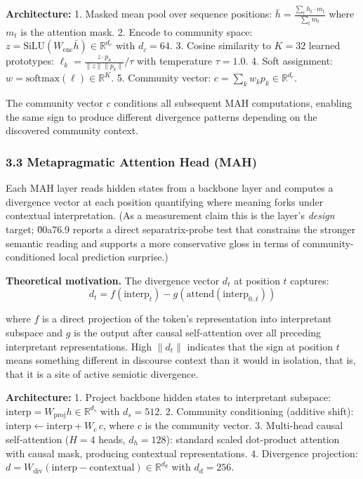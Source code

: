 \documentclass[
  11pt]{article}
\begin{document}
\textbf{Architecture:} 1. Masked mean pool over sequence positions:
\(\bar{h} = \frac{\sum_t h_t \cdot m_t}{\sum_t m_t}\) where \(m_t\) is
the attention mask. 2. Encode to community space:
\(z = \text{SiLU}(W_{\text{enc}} \bar{h}) \in \mathbb{R}^{d_c}\) with
\(d_c = 64\). 3. Cosine similarity to \(K = 32\) learned prototypes:
\(\ell_k = \frac{z \cdot p_k}{\|z\| \|p_k\|} / \tau\) with temperature
\(\tau = 1.0\). 4. Soft assignment:
\(w = \text{softmax}(\ell) \in \mathbb{R}^K\). 5. Community vector:
\(c = \sum_k w_k p_k \in \mathbb{R}^{d_c}\).

The community vector \(c\) conditions all subsequent MAH computations,
enabling the same sign to produce different divergence patterns
depending on the discovered community context.

\subsubsection{3.3 Metapragmatic Attention Head
(MAH)}\label{metapragmatic-attention-head-mah}

Each MAH layer reads hidden states from a backbone layer and computes a
divergence vector at each position quantifying where meaning forks under
contextual interpretation. (As a measurement claim this is the layer's
\emph{design} target; \u00a76.9 reports a direct separatrix-probe test
that constrains the stronger semantic reading and supports a more
conservative gloss in terms of community-conditioned local prediction
surprise.)

\textbf{Theoretical motivation.} The divergence vector \(d_t\) at
position \(t\) captures:
\[d_t = f(\text{interp}_t) - g(\text{attend}(\text{interp}_{0..t}))\]

where \(f\) is a direct projection of the token's representation into
interpretant subspace and \(g\) is the output after causal
self-attention over all preceding interpretant representations. High
\(\|d_t\|\) indicates that the sign at position \(t\) means something
different in discourse context than it would in isolation, that is, that
it is a site of active semiotic divergence.

\textbf{Architecture:} 1. Project backbone hidden states to interpretant
subspace: \(\text{interp} = W_{\text{proj}} h \in \mathbb{R}^{d_s}\)
with \(d_s = 512\). 2. Community conditioning (additive shift):
\(\text{interp} \leftarrow \text{interp} + W_c \, c\), where \(c\) is
the community vector. 3. Multi-head causal self-attention (\(H = 4\)
heads, \(d_h = 128\)): standard scaled dot-product attention with causal
mask, producing contextual representations. 4. Divergence projection:
\(d = W_{\text{div}} (\text{interp} - \text{contextual}) \in \mathbb{R}^{d_d}\)
with \(d_d = 256\).
\end{document}
